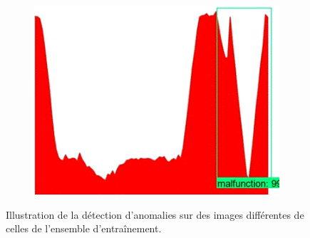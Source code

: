 \documentclass[french]{article}
\theoremstyle{mytheoremstyle}
\theoremstyle{mytheoremstyle}
\theoremstyle{myproblemstyle}
\begin{document}
\begin{figure}[H]
\begin{subfigure}[t]{0.3\textwidth}
            \includegraphics[width=1\textwidth]{images/od_3.png}
    \end{subfigure}
    \caption{Illustration de la détection d'anomalies sur des images différentes de celles de l'ensemble d'entraînement.}
    \end{figure}
\end{document}
